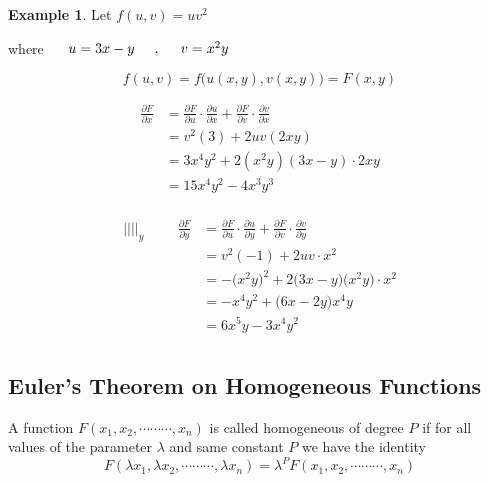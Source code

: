 \documentclass[11pt,a4paper]{article}
\theoremstyle{definition}
\newtheorem{exa}[thm]{Example}
\begin{document}
\begin{exa}


Let $f(u,v) = uv^2$


where $\hspace{0.5cm} u = 3x-y\hspace{0.5cm}, \hspace{0.5cm} v = x^2y$

$$f(u,v) = f\big(u(x,y), v(x,y)\big) = F(x,y)$$

\begin{align*}
\frac{\partial F}{\partial x} & = \frac{\partial F}{\partial u}\cdot \frac{\partial u}{\partial x} + \frac{\partial F}{\partial v}\cdot \frac{\partial v}{\partial x}\\
& = v^2(3) + 2uv(2xy)\\
& = 3x^4y^2 + 2(x^2y)(3x - y) \cdot 2xy\\
& = 15x^4y^2 - 4x^3y^3\\ 
\end{align*}

\begin{align*}
||||_y\hspace{1cm}  \frac{\partial F}{\partial y} & = \frac{\partial F}{\partial u}\cdot \frac{\partial u}{\partial y} +\frac{\partial F}{\partial v}\cdot \frac{\partial v}{\partial y}\\
& = v^2(-1) + 2uv\cdot x^2\\
& = -\big(x^2y\big)^2 + 2\big(3x -y\big)\big(x^2y\big)\cdot x^2\\
& = -x^4y^2 + \big(6x -2y\big)x^4y\\
& = 6x^5y - 3x^4y^2\\ 
\end{align*}
\end{exa}

{\color[wave]{485}\subsection{Euler's Theorem on Homogeneous Functions}}
A function $F(x_1,x_2,\cdots\cdots\cdots, x_n)$ is called homogeneous of degree $P$ if for all values of the parameter $\lambda$ and same constant $P$ we have the identity
$$F(\lambda x_1,\lambda x_2,\cdots\cdots\cdots, \lambda x_n) = \lambda^P F(x_1,x_2,\cdots\cdots\cdots,x_n)$$
\end{document}

